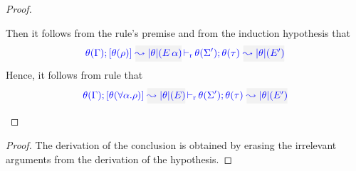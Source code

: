 \begin{proof}
\begin{description}
  Then it follows from the rule's premise and from the induction hypothesis that
\begin{equation*}
\dmres{\theta(\tenv)}{\theta(\rulet)}{\etrans\theta(\mmapp{E}{\alpha})}{\theta(\type)}{\etrans{\theta}(E')}{\theta(\Sigma')}
\end{equation*}
  Hence, it follows from rule  that
\begin{equation*}
  \dmres{\theta(\tenv)}{\theta(\tall{\alpha}{\rulet})}{\etrans\theta(E)}{\theta(\type)}{\etrans{\theta}(E')}{\theta(\Sigma')}
\end{equation*}
\end{description}
\end{proof}


{\centering
{}}

\begin{proof}
  The derivation of the conclusion is obtained by erasing the irrelevant arguments
  from the derivation of the hypothesis.
\end{proof}


{\centering
{}}


